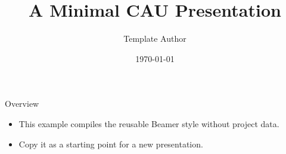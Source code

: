 \documentclass{beamer}
\title[Minimal CAU Presentation]{A Minimal CAU Presentation}
\author[Template Author]{Template Author}
\institute[CAU]{Christian-Albrechts-Universität zu Kiel}
\date{\today}
\begin{document}
\begin{frame}
  \titlepage
\end{frame}

\begin{frame}{Overview}
  \begin{itemize}
    \item This example compiles the reusable Beamer style without project data.
    \item Copy it as a starting point for a new presentation.
  \end{itemize}
\end{frame}
\end{document}

